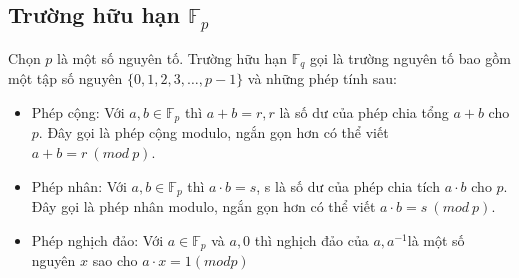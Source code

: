 \documentclass[a4paper,12pt]{report}
\begin{document}
\subsection*{Trường hữu hạn $\mathbb{F}_p$}
Chọn $p$ là một số nguyên tố. Trường hữu hạn $\mathbb{F}_q$ gọi là trường nguyên tố bao gồm một tập số nguyên $\{0, 1, 2, 3, \ldots , p - 1\}$ và những phép tính sau:
\begin{itemize}
\item Phép cộng: Với $a, b \in \mathbb{F}_p$ thì $a + b = r, r$ là số dư của phép chia tổng $a + b$ cho $p$. Đây gọi là phép cộng modulo, ngắn gọn hơn có thể viết $a + b = r \ (mod \ p)$.
\item Phép nhân: Với $a, b \in \mathbb{F}_p$ thì $a \cdot b = s$, s là số dư của phép chia tích $a \cdot b$ cho $p$. Đây gọi là phép nhân modulo, ngắn gọn hơn có thể viết $a \cdot b = s \ (mod \ p)$.
\item Phép nghịch đảo: Với $a \in \mathbb{F}_p$ và $a , 0$ thì nghịch đảo của $a, a^{-1}$là một số nguyên $x$ sao cho $a \cdot x = 1 (mod p)$
\end{itemize}
\end{document}
